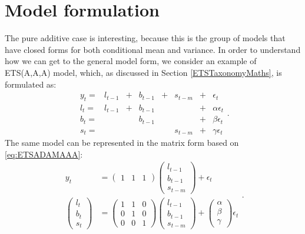 \documentclass[
]{book}
\theoremstyle{definition}
\theoremstyle{definition}
\theoremstyle{definition}
\theoremstyle{definition}
\theoremstyle{remark}
\begin{document}
\hypertarget{ADAMETSPureAdditive}{%
\section{Model formulation}\label{ADAMETSPureAdditive}}

The pure additive case is interesting, because this is the group of models that have closed forms for both conditional mean and variance. In order to understand how we can get to the general model form, we consider an example of ETS(A,A,A) model, which, as discussed in Section \ref{ETSTaxonomyMaths}, is formulated as:
\begin{equation}
  \begin{aligned}
    y_{t} = & l_{t-1} & + & b_{t-1} & + & s_{t-m} & + & \epsilon_t \\
    l_t = & l_{t-1} & + & b_{t-1} & & & + & \alpha \epsilon_t \\
    b_t = & & & b_{t-1} & & & + & \beta \epsilon_t \\
    s_t = & & & & & s_{t-m} & + & \gamma \epsilon_t 
  \end{aligned}.
  \label{eq:ETSADAMAAA}
\end{equation}
The same model can be represented in the matrix form based on \eqref{eq:ETSADAMAAA}:
\begin{equation}
  \begin{aligned}
    y_t & = \begin{pmatrix} 1 & 1 & 1 \end{pmatrix}
    \begin{pmatrix}
      l_{t-1} \\ b_{t-1} \\ s_{t-m}
    \end{pmatrix} +
    \epsilon_t \\
    \begin{pmatrix}
      l_t \\ b_t \\ s_t
    \end{pmatrix} & =
    \begin{pmatrix}
      1 & 1 & 0 \\ 0 & 1 & 0 \\ 0 & 0 & 1
    \end{pmatrix}
    \begin{pmatrix}
      l_{t-1} \\ b_{t-1} \\ s_{t-m}
    \end{pmatrix} +
    \begin{pmatrix}
      \alpha \\ \beta \\ \gamma
    \end{pmatrix}
    \epsilon_t 
  \end{aligned}.
  \label{eq:ETSADAMAAAMatrixForm}
\end{equation}
\end{document}
